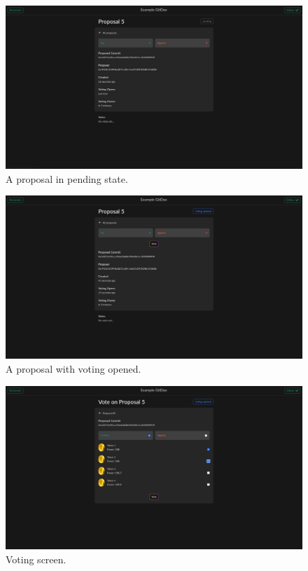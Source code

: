 \begin{figure}[ht!]
  \includegraphics[width=\linewidth]{images/demo/proposal_read.png}
  \caption{\label{fig:demo_proposal_read}A proposal in pending state.}
\end{figure}

\begin{figure}[ht!]
  \includegraphics[width=\linewidth]{images/demo/proposal_read_opened.png}
  \caption{\label{fig:demo_proposal_opened}A proposal with voting opened.}
\end{figure}

\begin{figure}[ht!]
  \includegraphics[width=\linewidth]{images/demo/proposal_vote.png}
  \caption{\label{fig:demo_proposal_vote}Voting screen.}
\end{figure}

